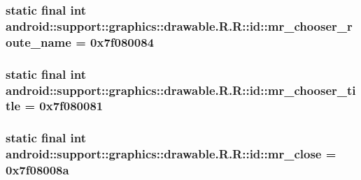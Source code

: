 \hypertarget{classandroid_1_1support_1_1graphics_1_1drawable_1_1_r_1_1id_27522e01fe36ca316fa95717ee7dc844}{
\subsubsection[{mr\_\-chooser\_\-route\_\-name}]{\setlength{\rightskip}{0pt plus 5cm}static final int android::support::graphics::drawable.R.R::id::mr\_\-chooser\_\-route\_\-name = 0x7f080084}}
\label{classandroid_1_1support_1_1graphics_1_1drawable_1_1_r_1_1id_27522e01fe36ca316fa95717ee7dc844}


\hypertarget{classandroid_1_1support_1_1graphics_1_1drawable_1_1_r_1_1id_6193146f303200bee8ef3a48e5b3e6f0}{
\subsubsection[{mr\_\-chooser\_\-title}]{\setlength{\rightskip}{0pt plus 5cm}static final int android::support::graphics::drawable.R.R::id::mr\_\-chooser\_\-title = 0x7f080081}}
\label{classandroid_1_1support_1_1graphics_1_1drawable_1_1_r_1_1id_6193146f303200bee8ef3a48e5b3e6f0}


\hypertarget{classandroid_1_1support_1_1graphics_1_1drawable_1_1_r_1_1id_7bb210352be2820c1367cc18059eb00f}{
\subsubsection[{mr\_\-close}]{\setlength{\rightskip}{0pt plus 5cm}static final int android::support::graphics::drawable.R.R::id::mr\_\-close = 0x7f08008a}}
\label{classandroid_1_1support_1_1graphics_1_1drawable_1_1_r_1_1id_7bb210352be2820c1367cc18059eb00f}


